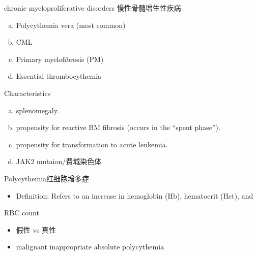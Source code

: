 \documentclass[
  ignorenonframetext,
]{beamer}
\providecommand{\tightlist}{%
  \setlength{\itemsep}{0pt}\setlength{\parskip}{0pt}}
\begin{document}
\begin{frame}
\begin{block}{chronic myeloproliferative disorders 慢性骨髓增生性疾病}
\protect\hypertarget{chronic-myeloproliferative-disorders-ux6162ux6027ux9aa8ux9ad3ux589eux751fux6027ux75beux75c5}{}
\begin{enumerate}
[a.]
\item
  Polycythemia vera (most common)
\item
  CML
\item
  Primary myelofibrosis (PM)
\item
  Essential thrombocythemia
\end{enumerate}
\end{block}
\end{frame}

\begin{frame}
\begin{block}{Characteristics}
\protect\hypertarget{characteristics}{}
\begin{enumerate}
[a.]
\item
  splenomegaly.
\item
  propensity for reactive BM fibrosis (occurs in the ``spent phase'').
\item
  propensity for transformation to acute leukemia.
\item
  JAK2 mutaion/费城染色体
\end{enumerate}
\end{block}
\end{frame}

\begin{frame}
\begin{block}{Polycythemia红细胞增多症}
\protect\hypertarget{polycythemiaux7ea2ux7ec6ux80deux589eux591aux75c7}{}
\begin{itemize}
\tightlist
\item
  Definition: Refers to an increase in hemoglobin (Hb), hematocrit
  (Hct), and
\end{itemize}

RBC count

\begin{itemize}
\item
  假性 vs 真性
\item
  malignant inappropriate absolute polycythemia
\end{itemize}
\end{block}
\end{frame}
\end{document}
